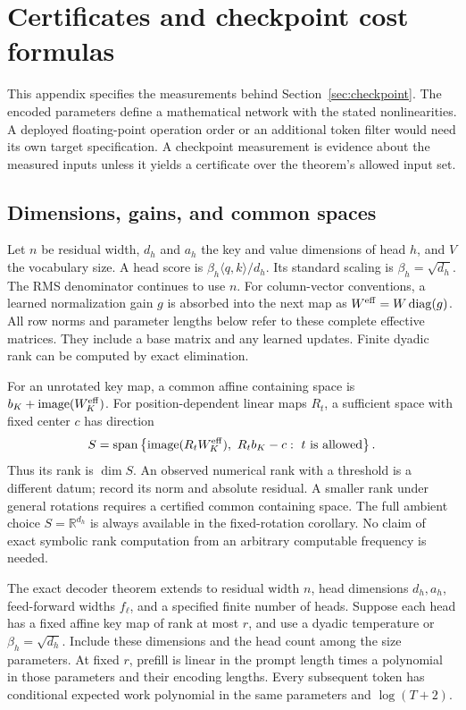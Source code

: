 \section{Certificates and checkpoint cost formulas}
\label{app:checkpoint}

This appendix specifies the measurements behind
Section~\ref{sec:checkpoint}. The encoded parameters define a
mathematical network with the stated nonlinearities. A deployed
floating-point operation order or an additional token filter would
need its own target specification. A checkpoint measurement is
evidence about the measured inputs unless it yields a certificate
over the theorem's allowed input set.

\subsection{Dimensions, gains, and common spaces}

Let $n$ be residual width, $d_h$ and $a_h$ the key and value
dimensions of head $h$, and $V$ the vocabulary size. A head score is
$\beta_h\langle q,k\rangle/d_h$. Its standard scaling is
$\beta_h=\sqrt{d_h}$. The RMS denominator continues to use $n$.
For column-vector conventions, a learned normalization gain $g$
is absorbed into the next map as
$W^{\rm eff}=W\operatorname{diag}(g)$.
All row norms and parameter lengths below refer to these complete
effective matrices. They include a base matrix and any learned
updates. Finite dyadic rank can be computed by exact elimination.

For an unrotated key map, a common affine containing space is
$b_K+\operatorname{image}(W_K^{\rm eff})$.
For position-dependent linear maps $R_t$, a sufficient space with
fixed center $c$ has direction
\[
 S=\operatorname{span}\left\{
 \operatorname{image}(R_tW_K^{\rm eff}),\
 R_tb_K-c:\ t\text{ is allowed}\right\}.
\]
Thus its rank is $\dim S$. An observed numerical rank with a
threshold is a different datum; record its norm and absolute
residual. A smaller rank under general rotations requires a
certified common containing space. The full ambient choice
$S=\mathbb R^{d_h}$ is always available in the fixed-rotation
corollary. No claim of exact symbolic rank computation from an
arbitrary computable frequency is needed.

\begin{corollary}
\label{cor:checkpoint-rectangular}
The exact decoder theorem extends to residual width $n$, head
dimensions $d_h,a_h$, feed-forward widths $f_\ell$, and a specified
finite number of heads. Suppose each head has a fixed affine key
map of rank at most $r$, and use a dyadic temperature or
$\beta_h=\sqrt{d_h}$. Include these dimensions and the head count
among the size parameters. At fixed $r$, prefill is linear in the
prompt length times a polynomial in those parameters and their
encoding lengths. Every subsequent token has conditional expected
work polynomial in the same parameters and $\log(T+2)$.
\end{corollary}

